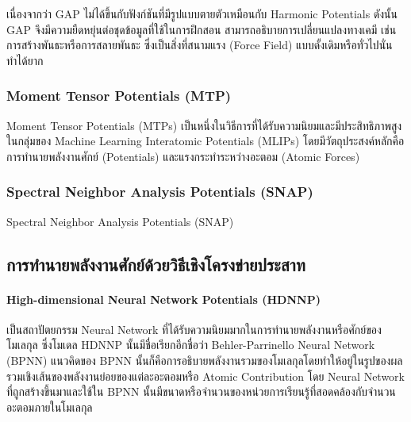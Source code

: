 เนื่องจากว่า GAP ไม่ได้ขึ้นกับฟังก์ชันที่มีรูปแบบตายตัวเหมือนกับ Harmonic Potentials ดังนั้น GAP จึงมีความยืดหยุ่นต่อชุดข้อมูลที่ใช้ในการฝึกสอน สามารถอธิบายการเปลี่ยนแปลงทางเคมี เช่น การสร้างพันธะหรือการสลายพันธะ ซึ่งเป็นสิ่งที่สนามแรง (Force Field) แบบดั้งเดิมหรือทั่วไปนั่นทำได้ยาก\autocite{ceriotti2018}

\subsubsection{Moment Tensor Potentials (MTP)} 

Moment Tensor Potentials (MTPs) เป็นหนึ่งในวิธีการที่ได้รับความนิยมและมีประสิทธิภาพสูงในกลุ่มของ Machine Learning Interatomic Potentials (MLIPs) โดยมีวัตถุประสงค์หลักคือการทำนายพลังงานศักย์ (Potentials) และแรงกระทำระหว่างอะตอม (Atomic Forces)\autocite{shapeev2016}

\subsubsection{Spectral Neighbor Analysis Potentials (SNAP)} 

Spectral Neighbor Analysis Potentials (SNAP)\autocite{thompson2015,deng2019,cusentino2020,domina2022}

\subsection{การทำนายพลังงานศักย์ด้วยวิธีเชิงโครงข่ายประสาท}
\label{ssec:pred_pot_ener_nn}

\paragraph{High-dimensional Neural Network Potentials (HDNNP)}\autocite{behler2007} เป็นสถาปัตยกรรม Neural Network ที่ได้รับความนิยมมากในการทำนายพลังงานหรือศักย์ของโมเลกุล ซึ่งโมเดล HDNNP นั้นมีชื่อเรียกอีกชื่อว่า Behler-Parrinello Neural Network (BPNN) แนวคิดของ BPNN นั้นก็คือการอธิบายพลังงานรวมของโมเลกุลโดยทำให้อยู่ในรูปของผลรวมเชิงเส้นของพลังงานย่อยของแต่ละอะตอมหรือ Atomic Contribution โดย Neural Network ที่ถูกสร้างขึ้นมาและใช้ใน BPNN นั้นมีขนาดหรือจำนวนของหน่วยการเรียนรู้ที่สอดคล้องกับจำนวนอะตอมภายในโมเลกุล

